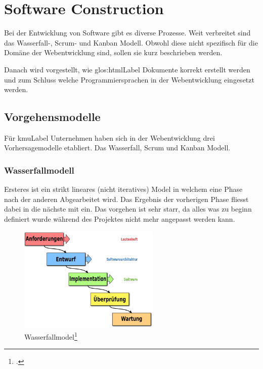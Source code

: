 \chapter{Software Construction}

Bei der Entwicklung von Software gibt es diverse Prozesse. Weit verbreitet sind das Wasserfall-, Scrum- und Kanban Modell. Obwohl diese nicht spezifisch für die Domäne der Webentwicklung sind, sollen sie kurz beschrieben werden.

Danach wird vorgestellt, wie \Gls{glos:htmlLabel} Dokumente korrekt erstellt werden und zum Schluss welche Programmiersprachen in der Webentwicklung eingesetzt werden.

\section{Vorgehensmodelle}
Für \gls{kmuLabel} Unternehmen haben sich in der Webentwicklung drei Vorhersagemodelle etabliert. Das Wasserfall, Scrum und Kanban Modell. 

\subsection{Wasserfallmodell}
Ersteres ist ein strikt lineares (nicht iteratives) Model in welchem eine Phase nach der anderen Abgearbeitet wird. Das Ergebnis der vorherigen Phase fliesst dabei in die nächste mit ein. Das vorgehen ist sehr starr, da alles was zu beginn definiert wurde während des Projektes nicht mehr angepasst werden kann.

\begin{figure}[H]
  \centering
  \includegraphics[width=0.6\textwidth]{images/wasserfall.png}
  \caption{Wasserfallmodel\footcite{Waterfall_model-de_-_Wasserfallmodell__Wikipedia_2015-06-03}}
  \label{fig:softwareconstruction:vorgehensmodelle:wasserfall}
\end{figure}

